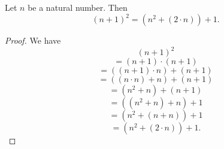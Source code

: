 \documentclass[10pt]{article}
\begin{document}
  \begin{forthel}
    \begin{proposition}
      Let $n$ be a natural number.
      Then \[ (n + 1)^{2} = (n^{2} + (2 \cdot n)) + 1. \]
    \end{proposition}
    \begin{proof}
      We have
      \[  (n + 1)^{2}                       \]
      \[    = (n + 1) \cdot (n + 1)         \]
      \[    = ((n + 1) \cdot n) + (n + 1)   \]
      \[    = ((n \cdot n) + n) + (n + 1)   \]
      \[    = (n^{2} + n) + (n + 1)         \]
      \[    = ((n^{2} + n) + n) + 1         \]
      \[    = (n^{2} + (n + n)) + 1         \]
      \[    = (n^{2} + (2 \cdot n)) + 1.    \]
    \end{proof}
  \end{forthel}
\end{document}
